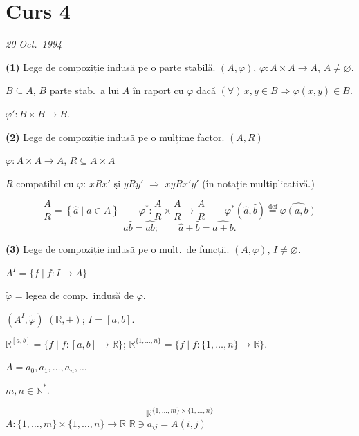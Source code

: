 \documentclass[12pt]{article}
\begin{document}
\section{Curs 4}

\begin{center}
\end{center}
\begin{flushright}
\textit{20 Oct.\ 1994}
\end{flushright}

\bigskip
\noindent\textbf{(1)} Lege de compoziție indusă pe o parte stabilă. $(A,\varphi)$, $\varphi : A\times A \to A$, $A\neq\varnothing$.

\noindent $B\subseteq A$, $B$ parte stab.\ a lui $A$ în raport cu $\varphi$ dacă $(\forall)\,x,y\in B \Rightarrow \varphi(x,y)\in B$.

\noindent $\varphi' : B\times B \to B$.

\bigskip
\noindent\textbf{(2)} Lege de compoziție indusă pe o mulțime factor. $(A,R)$

\noindent $\varphi : A\times A \to A$, \quad $R\subseteq A\times A$

\noindent $R$ compatibil cu $\varphi$: \quad $xRx'$ şi $yRy'$ $\Rightarrow$ $xyRx'y'$ (în notație multiplicativă.)

\[
\frac{A}{R} = \left\{\hat a \mid a\in A\right\} \qquad \varphi^* : \frac{A}{R}\times\frac{A}{R} \to \frac{A}{R} \qquad \varphi^*(\hat a,\hat b) \overset{\text{def}}{=} \widehat{\varphi(a,b)}
\]
\[
\hat a\hat b = \widehat{ab}; \qquad \hat a + \hat b = \widehat{a+b}.
\]

\bigskip
\noindent\textbf{(3)} Lege de compoziție indusă pe o mult.\ de funcții. $(A,\varphi)$, $I\neq\varnothing$.

\noindent $A^I = \{f \mid f:I\to A\}$

\noindent $\tilde\varphi$ = legea de comp.\ indusă de $\varphi$.

\noindent $(A^I,\tilde\varphi)$ \qquad $(\mathbb{R},+)$; $I=[a,b]$.

\noindent $\mathbb{R}^{[a,b]} = \{f \mid f:[a,b]\to\mathbb{R}\}$; \qquad $\mathbb{R}^{\{1,\ldots,n\}} = \{f \mid f:\{1,\ldots,n\}\to\mathbb{R}\}$.

\medskip
\noindent $A = a_0,a_1,\ldots,a_n,\ldots$

\noindent $m,n\in\mathbb{N}^*$.

\[
\mathbb{R}^{\{1,\ldots,m\}\times\{1,\ldots,n\}}
\]
\noindent $A : \{1,\ldots,m\}\times\{1,\ldots,n\} \to \mathbb{R}$ \hfill $\mathbb{R}\ni a_{ij} = A(i,j)$
\end{document}
